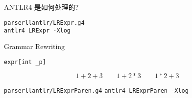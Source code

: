 
\begin{frame}{}
  \begin{center}
    \Large{ANTLR4 是如何处理的?}
  \end{center}
\end{frame}

\begin{frame}{}
  \begin{center}
	\texttt{parserllantlr/LRExpr.g4} \\[30pt]
	\pause
	\texttt{antlr4 LRExpr -Xlog} \\[20pt]
  \end{center}
\end{frame}

\begin{frame}{}
  \begin{center}
	Grammar Rewriting

  \end{center}
\end{frame}

\begin{frame}{}

  \begin{center}
	\texttt{expr[int \_p]}
  \end{center}

\end{frame}

\begin{frame}{}

  \[
	1 + 2 + 3 \qquad 1 + 2 \ast 3 \qquad 1 * 2 + 3
  \]
\end{frame}

\begin{frame}{}
  \begin{center}
	\texttt{parserllantlr/LRExprParen.g4}
	\pause
	\texttt{antlr4 LRExprParen -Xlog}
  \end{center}
\end{frame}
